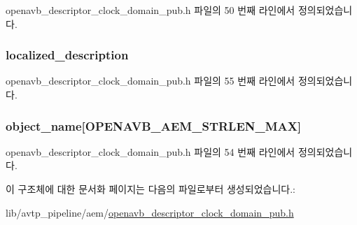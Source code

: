 openavb\+\_\+descriptor\+\_\+clock\+\_\+domain\+\_\+pub.\+h 파일의 50 번째 라인에서 정의되었습니다.

\subsubsection[{\texorpdfstring{localized\+\_\+description}{localized_description}}]{ localized\+\_\+description}\hypertarget{structopenavb__aem__descriptor__clock__domain__t_afd613361c59409fb6dcc0c237d1cfbfd}{}\label{structopenavb__aem__descriptor__clock__domain__t_afd613361c59409fb6dcc0c237d1cfbfd}


openavb\+\_\+descriptor\+\_\+clock\+\_\+domain\+\_\+pub.\+h 파일의 55 번째 라인에서 정의되었습니다.

\subsubsection[{\texorpdfstring{object\+\_\+name}{object_name}}]{ object\+\_\+name\mbox{[}{\bf O\+P\+E\+N\+A\+V\+B\+\_\+\+A\+E\+M\+\_\+\+S\+T\+R\+L\+E\+N\+\_\+\+M\+AX}\mbox{]}}\hypertarget{structopenavb__aem__descriptor__clock__domain__t_a5e98aba8105a7a6d82fac41816c83da3}{}\label{structopenavb__aem__descriptor__clock__domain__t_a5e98aba8105a7a6d82fac41816c83da3}


openavb\+\_\+descriptor\+\_\+clock\+\_\+domain\+\_\+pub.\+h 파일의 54 번째 라인에서 정의되었습니다.



이 구조체에 대한 문서화 페이지는 다음의 파일로부터 생성되었습니다.\+:\begin{DoxyCompactItemize}
\item 
lib/avtp\+\_\+pipeline/aem/\hyperlink{openavb__descriptor__clock__domain__pub_8h}{openavb\+\_\+descriptor\+\_\+clock\+\_\+domain\+\_\+pub.\+h}\end{DoxyCompactItemize}
